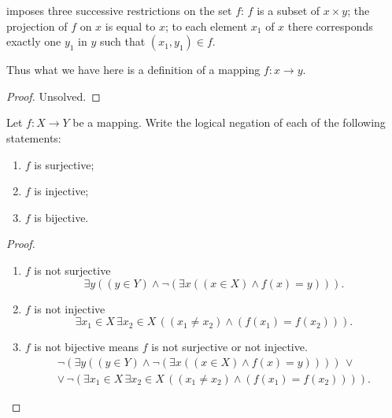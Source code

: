 \begin{exercise}
\begin{enumerate}[label={(\alph*)}]
              imposes three successive restrictions on the set $f$: $f$ is a subset of $x \times y$; the projection of $f$ on $x$ is equal to $x$; to each element $x_{1}$ of $x$ there corresponds exactly one $y_{1}$ in $y$ such that $(x_{1} , y_{1}) \in f$.

              Thus what we have here is a definition of a mapping $f: x \to y$.
    \end{enumerate}
\end{exercise}

\begin{proof}
    Unsolved.
\end{proof}
\newpage

\begin{exercise}
    Let $f: X\to Y$ be a mapping. Write the logical negation of each of the following statements:
    \begin{enumerate}[label={(\alph*)}]
        \item $f$ is surjective;
        \item $f$ is injective;
        \item $f$ is bijective.
    \end{enumerate}
\end{exercise}

\begin{proof}
    \begin{enumerate}[label={(\alph*)}]
        \item $f$ is not surjective
              \[
                  \exists y\left((y\in Y)\land \neg \left( \exists x\left( (x\in X)\land f(x) = y \right) \right)\right).
              \]
        \item $f$ is not injective
              \[
                  \exists x_{1}\in X\, \exists x_{2}\in X\, \left( (x_{1}\ne x_{2})\land (f(x_{1}) = f(x_{2})) \right).
              \]
        \item $f$ is not bijective means $f$ is not surjective or not injective.
              \begin{gather*}
                  \neg\left(\exists y\left((y\in Y)\land \neg \left( \exists x\left( (x\in X)\land f(x) = y \right) \right)\right)\right)\, \lor \\
                  \lor\, \neg\left(\exists x_{1}\in X\, \exists x_{2}\in X\, \left( (x_{1}\ne x_{2})\land (f(x_{1}) = f(x_{2})) \right)\right).
              \end{gather*}
    \end{enumerate}
\end{proof}
\newpage

